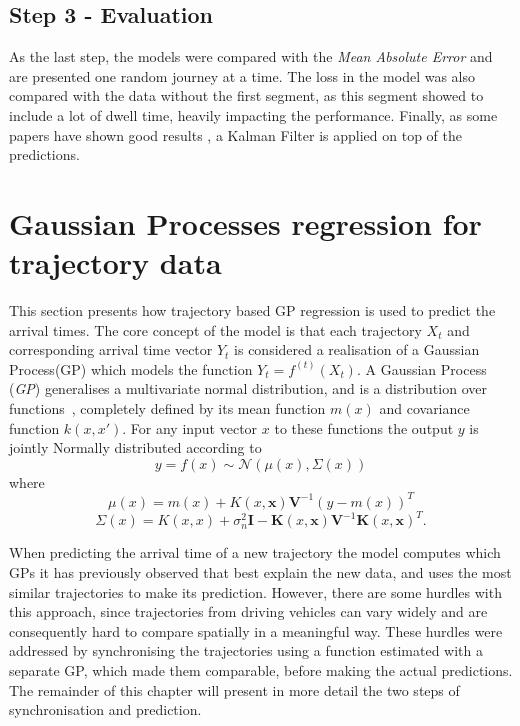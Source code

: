 \subsection{Step 3 - Evaluation}
As the last step, the models were compared with the \textit{Mean Absolute Error} and are presented one random journey at a time. The loss in the model was also compared with the data without the first segment, as this segment showed to include a lot of dwell time, heavily impacting the performance. Finally, as some papers have shown good results \cite{kalmanPrediction, brazilANN}, a Kalman Filter is applied on top of the predictions.

\section{Gaussian Processes regression for trajectory data}
This section presents how trajectory based GP regression is used to predict the arrival times. The core concept of the model is that each trajectory $X_t$ and corresponding arrival time vector $Y_t$ is considered a realisation of a Gaussian Process(GP) which models the function $Y_t = f^{(t)}(X_t)$. A Gaussian Process (\textit{GP}) generalises a multivariate normal distribution, and is a distribution over functions~\cite{Rasmussen-Williams-2006}, completely defined by its mean function $m(x)$ and covariance function $k(x, x')$. For any input vector $x$ to these functions the output $y$ is jointly Normally distributed according to
\begin{equation}
  \label{eq:gp}
  y = f(x) \sim \mathcal{N}(\mu(x), \Sigma(x))
\end{equation}
where
\begin{equation}
  \label{eq:gp-mean-function}
  \mu(x) = m(x) + K(x, \textbf{x})\textbf{V}^{-1}{(y-m(x))}^{T}
\end{equation}
\begin{equation}
  \label{eq:gp-covariance-function}
  \Sigma(x) = K(x, x) + \sigma^{2}_n\textbf{I} - \textbf{K}(x, \textbf{x})\textbf{V}^{-1}{\textbf{K}(x, \textbf{x})}^{T}.
\end{equation}

When predicting the arrival time of a new trajectory the model
computes which GPs it has previously observed that best explain the
new data, and uses the most similar trajectories to make its
prediction. However, there are some hurdles with this approach, since
trajectories from driving vehicles can vary widely and are
consequently hard to compare spatially in a meaningful way. These
hurdles were addressed by synchronising the trajectories using a
function estimated with a separate GP, which made them comparable, before making the actual predictions. The remainder of this chapter will present in more detail the two steps of synchronisation and prediction.

